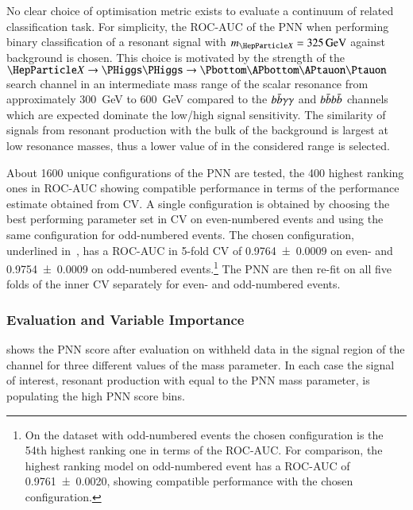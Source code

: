 No clear choice of optimisation metric exists to evaluate a continuum
of related classification task. For simplicity, the ROC-AUC of the PNN
when performing binary classification of a resonant signal with
$\mX = \SI{325}{\GeV}$ against background is chosen. This choice is
motivated by the strength of the $\PX \to \HH \to \bbtautau$ search
channel in an intermediate mass range of the scalar resonance from
approximately \SI{300}{\GeV} to \SI{600}{\GeV} compared to the
$b\bar{b}\gamma\gamma$ and $b\bar{b}b\bar{b}$ channels which are expected
dominate the low/high \mX signal sensitivity. The similarity of \HH
signals from resonant production with the bulk of the background is
largest at low resonance masses, thus a lower value of \mX in the
considered range is selected.

About 1600 unique configurations of the PNN are tested, the 400
highest ranking ones in ROC-AUC showing compatible performance in
terms of the performance estimate obtained from CV. A single
configuration is obtained by choosing the best performing parameter
set in CV on even-numbered events and using the same configuration for
odd-numbered events. The chosen configuration, underlined
in~, has a ROC-AUC in 5-fold CV of
\num{0.9764 +- 0.0009} on even- and \num{0.9754 +- 0.0009} on
odd-numbered events.\footnote{On the dataset with odd-numbered events
  the chosen configuration is the 54th highest ranking one in terms of
  the ROC-AUC. For comparison, the highest ranking model on
  odd-numbered event has a ROC-AUC of \num{0.9761 +- 0.0020}, showing
  compatible performance with the chosen configuration.} The PNN are
then re-fit on all five folds of the inner CV separately for even- and
odd-numbered events.

\subsubsection{Evaluation and Variable Importance}

 shows the PNN score after evaluation on
withheld data in the signal region of the \hadhad channel for three
different values of the mass parameter. In each case the signal of
interest, resonant \HH production with \mX equal to the PNN mass
parameter, is populating the high PNN score bins.

